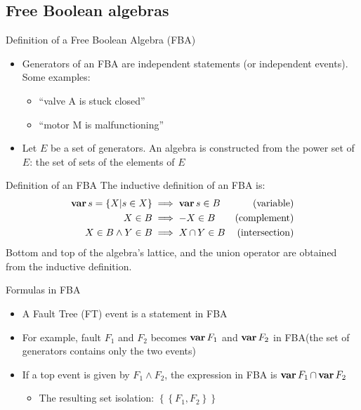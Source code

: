 \documentclass{beamer}
\def\FT{%
	Fault Tree (FT)%
	\gdef\FT{FT\xspace}%
	\gdef\FTs{FTs\xspace}%
	\gdef\IFT{An FT\xspace}%
	\xspace%
}
\def\FTs{%
	Fault Trees (FTs)%
	\gdef\FT{FT\xspace}%
	\gdef\FTs{FTs\xspace}%
	\gdef\IFT{An FT\xspace}%
	\xspace%
}
\def\IFT{%
	A Fault Tree (FT)%
	\gdef\FT{FT\xspace}%
	\gdef\FTs{FTs\xspace}%
	\gdef\IFT{An FT\xspace}%
	\xspace%
}
\def\FBA{%
	Free Boolean Algebra (FBA)%
	\gdef\FBA{FBA\xspace}%
	\gdef\FBAs{FBAs\xspace}%
	\gdef\iFBA{an FBA\xspace}%
	\xspace%
}
\def\FBAs{%
	Free Boolean Algebras (FBAs)%
	\gdef\FBA{FBA\xspace}%
	\gdef\FBAs{FBAs\xspace}%
	\gdef\iFBA{an FBA\xspace}%
	\xspace%
}
\def\iFBA{%
	a Free Boolean Algebra (FBA)%
	\gdef\FBA{FBA\xspace}%
	\gdef\FBAs{FBAs\xspace}%
	\gdef\iFBA{an FBA\xspace}%
	\xspace%
}
\def\varop{\ensuremath\operatorname{\mathbf{var}}}
\newcommand{\var}[1]{\ensuremath\varop #1}
\def\inter{\ensuremath\operatorname{\cap}}
\begin{document}
\subsection{Free Boolean algebras}

\begin{frame}{Definition of \iFBA}
	\begin{itemize}
		\item Generators of \iFBA are independent statements (or independent events). Some examples:
		\begin{itemize}
			\item ``valve A is stuck closed''
			\item ``motor M is malfunctioning''
		\end{itemize}
		\item Let $E$ be a set of generators. An algebra is constructed from the power set of $E$: the set of sets of the elements of $E$
	\end{itemize}
\end{frame}

\begin{frame}[fragile]{Definition of \iFBA}
	The inductive definition of \iFBA is:
	\begin{subequations}
		\begin{align}
		\var s = \{X | s \in X\} & \implies \var s \in B & \text{(variable)}\\
		X \in B & \implies -X \in B                           & \text{(complement)}\\
		X \in B \land Y \in B & \implies X \inter Y \in B     & \text{(intersection)}
		\end{align}
	\end{subequations}
	Bottom and top of the algebra's lattice, and the union operator are obtained from the inductive definition.
\end{frame}

\begin{frame}{Formulas in \FBA}
	\begin{itemize}
		\item \IFT event is a statement in \FBA
		\item For example, fault $F_1$ and $F_2$ becomes $\var F_1$ and $\var F_2$ in \FBA (the set of generators contains only the two events)
		\item If a top event is given by $F_1 \land F_2$, the expression in \FBA is $\var F_1 \inter \var F_2$
		\begin{itemize}
			\item The resulting set isolation: 
			$\left\{
				\left\{F_1, F_2\right\}
			\right\}$
		\end{itemize}
	\end{itemize}
\end{frame}
\end{document}
